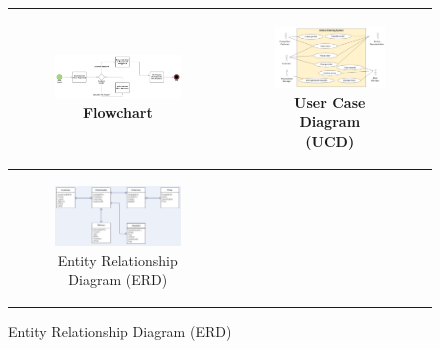 \begin{figure}[ht]
    \centering
	\begin{tabular}{|c|c|}
		\hline
		\begin{subfigure}[b]{0.44\textwidth}
			\centering
			\includegraphics[width=0.9\linewidth]{mainmatter/images/exampleflowchart.jpeg}
			\caption{Flowchart}
         	\label{fig:myfig35}
		\end{subfigure} & 
		\begin{subfigure}[b]{0.44\textwidth}
			\centering
			\vspace{0.2cm}
			\includegraphics[width=0.7\linewidth]{mainmatter/images/exampleucd.png}
			\caption{User Case Diagram (UCD)}
         	\label{fig:myfig36}
		\end{subfigure}	\\
		\hline
		\begin{subfigure}[b]{0.44\textwidth}
			\centering
			\includegraphics[width=0.8\linewidth]{mainmatter/images/exampleerd.png}
			\caption{Entity Relationship Diagram (ERD)}
         	\label{fig:myfig37}
		\end{subfigure} & 

\end{tabular}
\end{figure}
